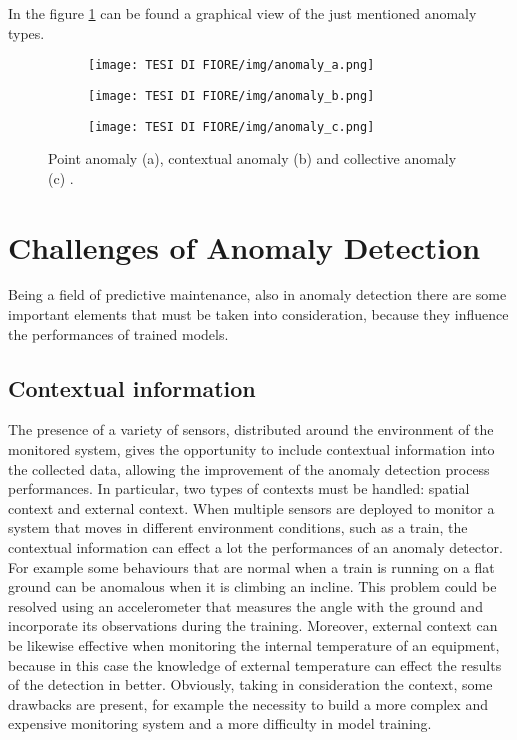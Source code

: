 In the figure \ref{anomalies} can be found a graphical view of the just mentioned anomaly types. 
\begin{figure}[ht]
\centering
\begin{subfigure}
    \centering
    \texttt{[image: TESI DI FIORE/img/anomaly\_a.png]}
\end{subfigure}
\begin{subfigure}
    \centering
    \texttt{[image: TESI DI FIORE/img/anomaly\_b.png]}
\end{subfigure}
\begin{subfigure}
    \centering
    \texttt{[image: TESI DI FIORE/img/anomaly\_c.png]}
\end{subfigure}
\caption{Point anomaly (a), contextual anomaly (b) and collective anomaly (c) \cite{6AnomalyIoTTimeSeries}.}
\label{anomalies}
\end{figure}

\section{Challenges of Anomaly Detection}
Being a field of predictive maintenance, also in anomaly detection there are some important elements that must be taken into consideration, because they influence the performances of trained models.
\subsection{Contextual information}
The presence of a variety of sensors, distributed around the environment of the monitored system, gives the opportunity to include contextual information into the collected data, allowing the improvement of the anomaly detection process performances. In particular, two types of contexts must be handled: spatial context and external context. When multiple sensors are deployed to monitor a system that moves in different environment conditions, such as a train, the contextual information can effect a lot the performances of an anomaly detector. For example some behaviours that are normal when a train is running on a flat ground can be anomalous when it is climbing an incline. This problem could be resolved using an accelerometer that measures the angle with the ground and incorporate its observations during the training. Moreover, external context can be likewise effective when monitoring the internal temperature of an equipment, because in this case the knowledge of external temperature can effect the results of the detection in better. Obviously, taking in consideration the context, some drawbacks are present, for example the necessity to build a more complex and expensive monitoring system and a more difficulty in model training.
